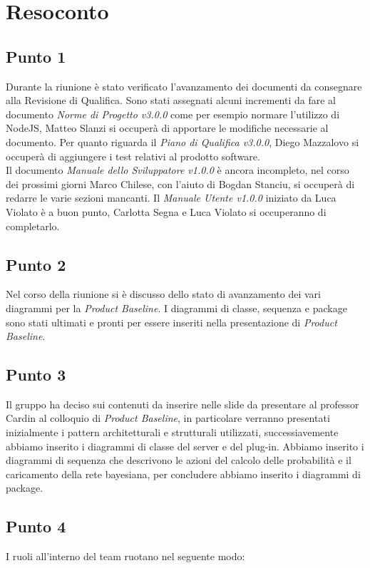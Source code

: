 \section{Resoconto}

\subsection{Punto 1}
Durante la riunione è stato verificato l'avanzamento dei documenti da consegnare alla Revisione di Qualifica. Sono stati assegnati alcuni incrementi da fare al documento \textit{Norme di Progetto v3.0.0} come per esempio normare l'utilizzo di NodeJS, Matteo Slanzi si occuperà di apportare le modifiche necessarie al documento.
Per quanto riguarda il \textit{Piano di Qualifica v3.0.0}, Diego Mazzalovo si occuperà di aggiungere i test relativi al prodotto software. \\
Il documento \textit{Manuale dello Sviluppatore v1.0.0} è ancora incompleto, nel corso dei prossimi giorni Marco Chilese, con l'aiuto di Bogdan Stanciu, si occuperà di redarre le varie sezioni mancanti. Il \textit{Manuale Utente v1.0.0} iniziato da Luca Violato è a buon punto, Carlotta Segna e Luca Violato si occuperanno di completarlo.

\subsection{Punto 2}
Nel corso della riunione si è discusso dello stato di avanzamento dei vari diagrammi per la \textit{Product Baseline}. I diagrammi di classe, sequenza e package sono stati ultimati e pronti per essere inseriti nella presentazione di \textit{Product Baseline}.

\subsection{Punto 3}
Il gruppo ha deciso sui contenuti da inserire nelle slide da presentare al professor Cardin al colloquio di \textit{Product Baseline}, in particolare verranno presentati inizialmente i pattern architetturali e strutturali  utilizzati, successiavemente abbiamo inserito i diagrammi di classe del server e del plug-in. Abbiamo inserito i diagrammi di sequenza che descrivono le azioni del calcolo delle probabilità e il caricamento della rete bayesiana, per concludere abbiamo inserito i diagrammi di package.  

\newpage
\subsection{Punto 4}
I ruoli all'interno del team ruotano nel seguente modo:\\

